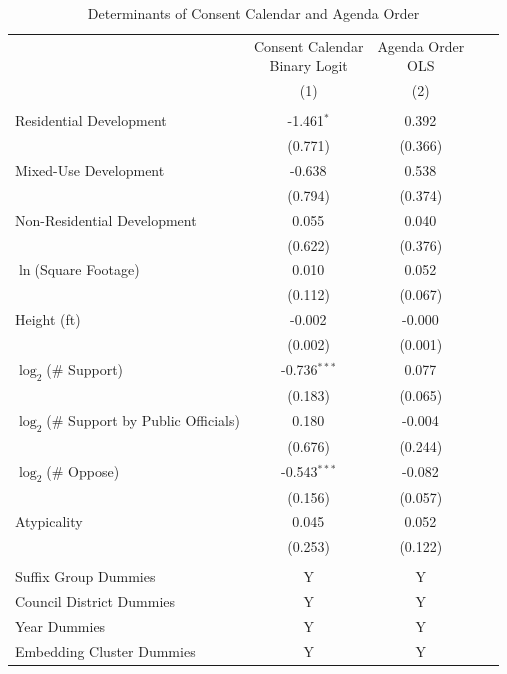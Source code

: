 \begin{table}[H]
\centering
\caption{Determinants of Consent Calendar and Agenda Order}
\vspace{0.2cm}
\label{tab_endogenous_agenda}
\begin{adjustbox}{max height=0.42\textheight}
\begin{threeparttable}
\begin{tabular}{lcccc}
\toprule
 & \makecell{Consent Calendar\\Binary Logit} & \makecell{Agenda Order\\OLS} \\
 & (1) & (2) \\
\midrule
 &  & \\
Residential Development  & -1.461$^{*}$ & 0.392$^{}$ \\
 & (0.771) & (0.366) \\ [1.8ex]
Mixed-Use Development  & -0.638$^{}$ & 0.538$^{}$ \\
 & (0.794) & (0.374) \\ [1.8ex]
Non-Residential Development  & 0.055$^{}$ & 0.040$^{}$ \\
 & (0.622) & (0.376) \\ [1.8ex]
$\ln$(Square Footage)  & 0.010$^{}$ & 0.052$^{}$ \\
 & (0.112) & (0.067) \\ [1.8ex]
Height (ft)  & -0.002$^{}$ & -0.000$^{}$ \\
 & (0.002) & (0.001) \\ [1.8ex]
$\log_2$(\# Support)  & -0.736$^{***}$ & 0.077$^{}$ \\
 & (0.183) & (0.065) \\ [1.8ex]
$\log_2$(\# Support by Public Officials)  & 0.180$^{}$ & -0.004$^{}$ \\
 & (0.676) & (0.244) \\ [1.8ex]
$\log_2$(\# Oppose)  & -0.543$^{***}$ & -0.082$^{}$ \\
 & (0.156) & (0.057) \\ [1.8ex]
Atypicality  & 0.045$^{}$ & 0.052$^{}$ \\
 & (0.253) & (0.122) \\ [1.8ex]

 & & & & \\ 
Suffix Group Dummies  & Y  & Y  \\ 
Council District Dummies  & Y  & Y  \\ 
Year Dummies  & Y  & Y  \\ 
Embedding Cluster Dummies  & Y  & Y  \\ 


\end{tabular}
\end{threeparttable}
\end{adjustbox}
\end{table}
